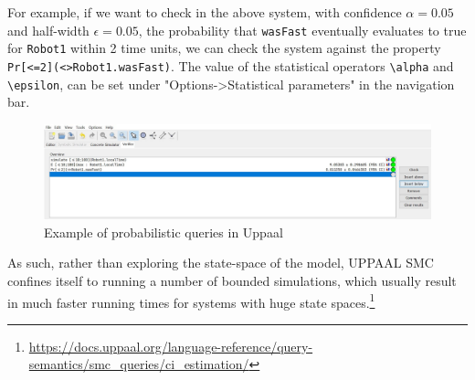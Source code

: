 For example, if we want to check in the above system,  with confidence $\alpha=0.05$ and half-width $\epsilon=0.05$, the probability that \verb|wasFast| eventually evaluates to true for \verb|Robot1| within 2 time units, we can check the system against the property \verb|Pr[<=2](<>Robot1.wasFast)|. The value of the statistical operators \verb|\alpha| and \verb|\epsilon|, can be set under "Options->Statistical parameters" in the navigation bar. 

\begin{figure}[h]
    \centering
    \includegraphics[width=1.0\linewidth]{pictures/properties_example.JPG}
    \caption{Example of probabilistic queries in Uppaal}
    \label{fig:ex-queries}
\end{figure}

As such, rather than exploring the state-space of the model, UPPAAL SMC confines itself to running a number of bounded simulations, which usually result in much faster running times for systems with huge state spaces.\footnote{\url{https://docs.uppaal.org/language-reference/query-semantics/smc_queries/ci_estimation/}}


 